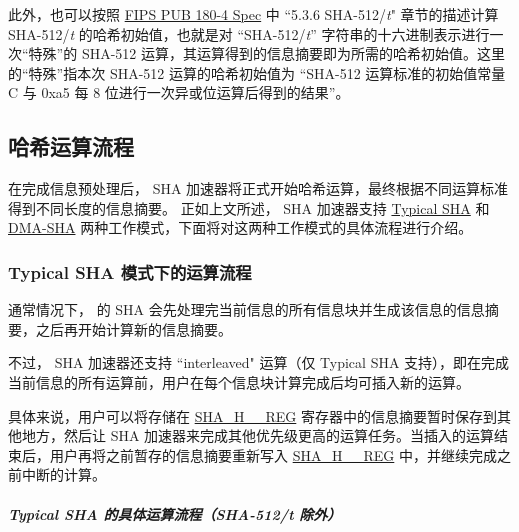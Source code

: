 \documentclass[main\_\_CN.tex]{subfiles}
\begin{document}
此外，也可以按照 \href{https://doi.org/10.6028/NIST.FIPS.180-4}{FIPS PUB 180-4 Spec} 中 ``5.3.6 SHA-512/{\it{t}}" 章节的描述计算 SHA-512/{\it{t}} 的哈希初始值，也就是对 “SHA-512/{\it{t}}” 字符串的十六进制表示进行一次“特殊”的 SHA-512 运算，其运算得到的信息摘要即为所需的哈希初始值。这里的“特殊”指本次 SHA-512 运算的哈希初始值为 “SHA-512 运算标准的初始值常量 C 与 0xa5 每 8 位进行一次异或位运算后得到的结果”。

\subsection{哈希运算流程}\label{sec:sha-hash-operation}

在完成信息预处理后，\chipname{} SHA 加速器将正式开始哈希运算，最终根据不同运算标准得到不同长度的信息摘要。
正如上文所述，\chipname{} SHA 加速器支持 \hyperref[sec:sha-typical-sha]{Typical SHA} 和 \hyperref[sec:sha-dma-sha]{DMA-SHA} 两种工作模式，下面将对这两种工作模式的具体流程进行介绍。

\subsubsection{Typical SHA 模式下的运算流程}\label{sec:sha-typical-sha}

通常情况下，\chipname{} 的 SHA 会先处理完当前信息的所有信息块并生成该信息的信息摘要，之后再开始计算新的信息摘要。

不过，\chipname{} SHA 加速器还支持 ``interleaved" 运算（仅 Typical SHA 支持），即在完成当前信息的所有运算前，用户在每个信息块计算完成后均可插入新的运算。

具体来说，用户可以将存储在 \hyperref[regdesc:SHAHNREG]{SHA\_H\_\_REG} 寄存器中的信息摘要暂时保存到其他地方，然后让 SHA 加速器来完成其他优先级更高的运算任务。当插入的运算结束后，用户再将之前暂存的信息摘要重新写入 \hyperref[regdesc:SHAHNREG]{SHA\_H\_\_REG} 中，并继续完成之前中断的计算。

\subparagraph{Typical SHA 的具体运算流程（SHA-512/{\it{t}} 除外）}
\end{document}
